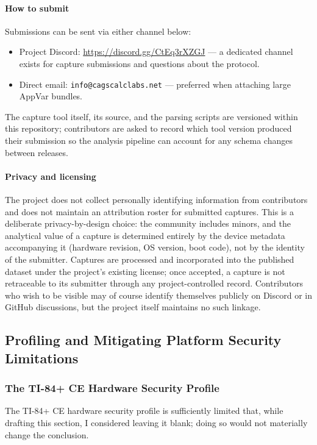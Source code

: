 \documentclass[titlepage]{report}
\begin{document}
	\paragraph{How to submit}
	Submissions can be sent via either channel below:
	\begin{itemize}
		\item Project Discord: \url{https://discord.gg/CtEq3rXZGJ} --- a dedicated channel exists for capture submissions and questions about the protocol.
		\item Direct email: \texttt{info@cagscalclabs.net} --- preferred when attaching large AppVar bundles.
	\end{itemize}
	The capture tool itself, its source, and the parsing scripts are versioned within this repository; contributors are asked to record which tool version produced their submission so the analysis pipeline can account for any schema changes between releases.

	\paragraph{Privacy and licensing}
	The project does not collect personally identifying information from contributors and does not maintain an attribution roster for submitted captures. This is a deliberate privacy-by-design choice: the community includes minors, and the analytical value of a capture is determined entirely by the device metadata accompanying it (hardware revision, OS version, boot code), not by the identity of the submitter. Captures are processed and incorporated into the published dataset under the project's existing license; once accepted, a capture is not retraceable to its submitter through any project-controlled record. Contributors who wish to be visible may of course identify themselves publicly on Discord or in GitHub discussions, but the project itself maintains no such linkage.

	\subsection{Profiling and Mitigating Platform Security Limitations}
	
	\subsubsection{The TI-84+ CE Hardware Security Profile}
	The TI-84+ CE hardware security profile is sufficiently limited that, while drafting this section, I considered leaving it blank; doing so would not materially change the conclusion.
	
\end{document}
